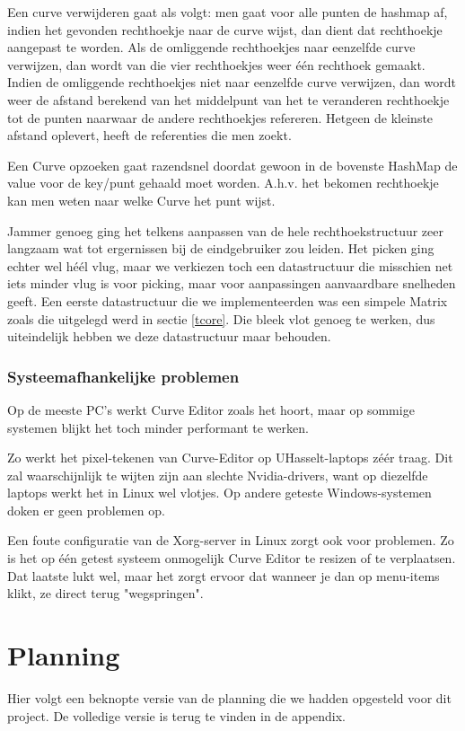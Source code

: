 \documentclass[a4paper,11pt,oneside, titlepage]{article}
\begin{document}
Een curve verwijderen gaat als volgt: men gaat voor alle punten de hashmap af, indien het gevonden rechthoekje naar de curve wijst, dan dient dat rechthoekje aangepast te worden. Als de omliggende rechthoekjes naar eenzelfde curve verwijzen, dan wordt van die vier rechthoekjes weer één rechthoek gemaakt. Indien de omliggende rechthoekjes niet naar eenzelfde curve verwijzen, dan wordt weer de afstand berekend van het middelpunt van het te veranderen rechthoekje tot de punten naarwaar de andere rechthoekjes refereren. Hetgeen de kleinste afstand oplevert, heeft de referenties die men zoekt. 

Een Curve opzoeken gaat razendsnel doordat gewoon in de bovenste HashMap de value voor de key/punt gehaald moet worden. 
A.h.v. het bekomen rechthoekje kan men weten naar welke Curve het punt wijst.

Jammer genoeg ging het telkens aanpassen van de hele rechthoekstructuur zeer langzaam wat tot ergernissen bij de eindgebruiker zou leiden. Het picken ging echter wel h\'e\'el vlug, maar we verkiezen toch een datastructuur die misschien net iets minder vlug is voor picking, maar voor aanpassingen aanvaardbare snelheden geeft.
Een eerste datastructuur die we implementeerden was een simpele Matrix zoals die uitgelegd werd in sectie \ref{tcore}. Die bleek vlot genoeg te werken, dus uiteindelijk hebben we deze datastructuur maar behouden.
\subsubsection{Systeemafhankelijke problemen}
Op de meeste PC's werkt Curve Editor zoals het hoort, maar op sommige systemen blijkt het toch minder performant te werken.

Zo werkt het pixel-tekenen van Curve-Editor op UHasselt-laptops z\'e\'er traag. Dit zal waarschijnlijk te wijten zijn aan slechte Nvidia-drivers, want op diezelfde laptops werkt het in Linux wel vlotjes.
Op andere geteste Windows-systemen doken er geen problemen op.

Een foute configuratie van de Xorg-server in Linux zorgt ook voor problemen. Zo is het op \'e\'en getest systeem onmogelijk Curve Editor te resizen of te verplaatsen. Dat laatste lukt wel, maar het zorgt ervoor dat 
wanneer je dan op menu-items klikt, ze direct terug "wegspringen".
\newpage
\section{Planning}
Hier volgt een beknopte versie van de planning die we hadden opgesteld voor dit project.
De volledige versie is terug te vinden in de appendix.
\end{document}

